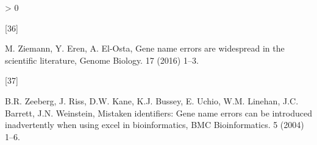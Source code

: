 \documentclass[]{elsarticle} %
\newlength{\csllabelwidth}
\newlength{\cslhangindent}
\newenvironment{CSLReferences}[3] %
 {%
  \setlength{\parindent}{0pt}
  \ifodd #1 \everypar{\setlength{\hangindent}{\cslhangindent}}\ignorespaces\fi
  \ifnum #2 > 0
  \setlength{\parskip}{#2\baselineskip}
  \fi
 }%
 {}
\newcommand{\CSLLeftMargin}[1]{\parbox[t]{\csllabelwidth}{#1}}
\newcommand{\CSLRightInline}[1]{\parbox[t]{\linewidth - \csllabelwidth}{#1}}
\begin{document}
\begin{CSLReferences}{0}{0}
\leavevmode\hypertarget{ref-ziemann2016gene}{}%
\CSLLeftMargin{{[}36{]} }
\CSLRightInline{M. Ziemann, Y. Eren, A. El-Osta, Gene name errors are
widespread in the scientific literature, Genome Biology. 17 (2016)
1--3.}

\leavevmode\hypertarget{ref-zeeberg2004mistaken}{}%
\CSLLeftMargin{{[}37{]} }
\CSLRightInline{B.R. Zeeberg, J. Riss, D.W. Kane, K.J. Bussey, E. Uchio,
W.M. Linehan, J.C. Barrett, J.N. Weinstein, Mistaken identifiers: Gene
name errors can be introduced inadvertently when using excel in
bioinformatics, BMC Bioinformatics. 5 (2004) 1--6.}

\end{CSLReferences}
\end{document}
